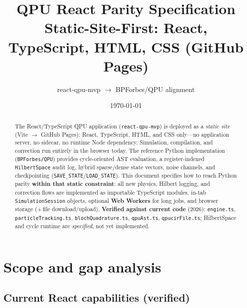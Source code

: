 \documentclass[11pt,a4paper]{article}
\title{\textbf{QPU React Parity Specification}\\[0.4em]
\large Static-Site-First: React, TypeScript, HTML, CSS (GitHub Pages)}
\author{react-qpu-mvp $\rightarrow$ BPForbes/QPU alignment}
\date{\today}
\begin{document}
\maketitle

\begin{abstract}
The React/TypeScript QPU application (\texttt{react-qpu-mvp}) is deployed as a \emph{static site} (Vite $\rightarrow$ GitHub Pages): React, TypeScript, HTML, and CSS only---no application server, no sidecar, no runtime Node dependency. Simulation, compilation, and correction run entirely in the browser today. The reference Python implementation (\texttt{BPForbes/QPU}) provides cycle-oriented AST evaluation, a register-indexed \texttt{HilbertSpace} audit log, hybrid sparse/dense state vectors, noise channels, and checkpointing (\texttt{SAVE\_STATE}/\texttt{LOAD\_STATE}). This document specifies how to reach Python parity \textbf{within that static constraint}: all new physics, Hilbert logging, and correction flows are implemented as importable TypeScript modules, in-tab \texttt{SimulationSession} objects, optional \textbf{Web Workers} for long jobs, and browser storage (+\,file download/upload). \textbf{Verified against current code} (2026): \texttt{engine.ts}, \texttt{particleTracking.ts}, \texttt{blochQuadrature.ts}, \texttt{qpuAst.ts}, \texttt{qpucirFile.ts}; HilbertSpace and cycle runtime are \emph{specified}, not yet implemented.
\end{abstract}

\tableofcontents
\newpage

\section{Scope and gap analysis}

\subsection{Current React capabilities (verified)}
\end{document}
